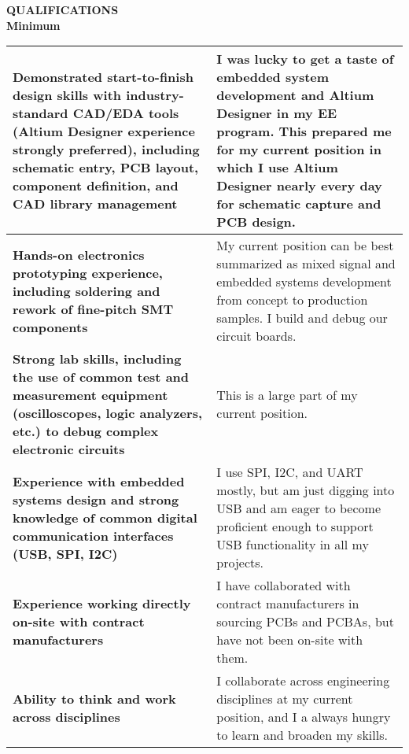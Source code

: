 \documentclass[10pt,letterpaper, table]{article}
\begin{document}
 \vspace{.5pc} 
\vspace*{\fill}

\newpage

{\noindent\sc\bf QUALIFICATIONS}\vspace{.5pc}\\ 
{\indent\indent\sc\bf Minimum}
\begin{table}[h!]
\centering
{

\setlength{\tabcolsep}{20pt} %
\renewcommand{\arraystretch}{2} %
 \begin{tabular}{||  m{20 em} | m{20 em} ||} 

 \hline
 \textbf{Demonstrated start-to-finish design skills with industry-standard CAD/EDA tools (Altium Designer experience strongly preferred), including schematic entry, PCB layout, component definition, and CAD library management} & I was lucky to get a taste of embedded system development and Altium Designer in my EE program. This prepared me for my current position in which I use Altium Designer nearly every day for schematic capture and PCB design.     \\ 
  \hline
  
 \textbf{Hands-on electronics prototyping experience, including soldering and rework of fine-pitch SMT components} & My current position can be best summarized as mixed signal and embedded systems development from concept to production samples. I build and debug our circuit boards.   \\
 \hline
 
 \textbf{Strong lab skills, including the use of common test and measurement equipment (oscilloscopes, logic analyzers, etc.) to debug complex electronic circuits} & This is a large part of my current position.   \\
 \hline
 
 \textbf{Experience with embedded systems design and strong knowledge of common digital communication interfaces (USB, SPI, I2C)} & I use SPI, I2C, and UART mostly, but am just digging into USB and am eager to become proficient enough to support USB functionality in all my projects.   \\
 \hline
 
 \textbf{Experience working directly on-site with contract manufacturers} & I have collaborated with contract manufacturers in sourcing PCBs and PCBAs, but have not been on-site with them.  \\ [1ex] 
 \hline
 
  \textbf{Ability to think and work across disciplines} & I collaborate across engineering disciplines at my current position, and I a always hungry to learn and broaden my skills.   \\ [1ex] 
 \hline
 \end{tabular}

 }
\end{table}
\end{document}
